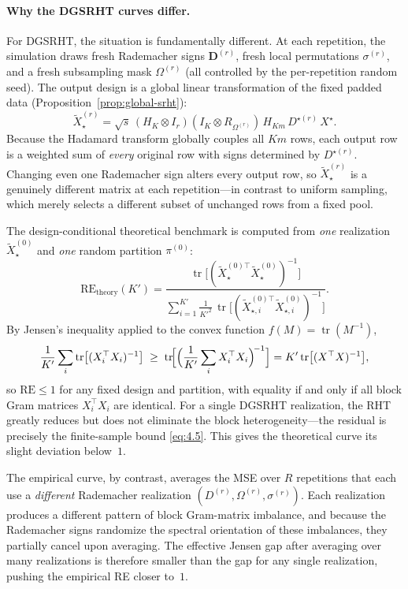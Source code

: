 \documentclass[11pt]{article}
\numberwithin{equation}{section}
\theoremstyle{plain}
\theoremstyle{definition}
\theoremstyle{remark}
\begin{document}
\paragraph{Why the DGSRHT curves differ.}
For DGSRHT, the situation is fundamentally different.
At each repetition, the simulation draws fresh Rademacher signs $\mathbf{D}^{(r)}$, fresh local permutations $\sigma^{(r)}$, and a fresh subsampling mask $\Omega^{(r)}$ (all controlled by the per-repetition random seed).
The output design is a global linear transformation of the fixed padded data (Proposition~\ref{prop:global-srht}):
\[
  \tilde{X}_{\star}^{(r)}
  = \sqrt{s}\,(H_K\otimes I_r)(I_K\otimes R_{\Omega^{(r)}})\,H_{Km}\,D^{\star(r)}\,X^{\star}.
\]
Because the Hadamard transform globally couples all $Km$ rows, each output row is a weighted sum of \emph{every} original row with signs determined by $D^{\star(r)}$.
Changing even one Rademacher sign alters every output row, so $\tilde{X}_{\star}^{(r)}$ is a genuinely different matrix at each repetition---in contrast to uniform sampling, which merely selects a different subset of unchanged rows from a fixed pool.

The design-conditional theoretical benchmark is computed from \emph{one} realization $\tilde{X}_{\star}^{(0)}$ and \emph{one} random partition $\pi^{(0)}$:
\[
  \mathrm{RE}_{\mathrm{theory}}(K')
  = \frac{\operatorname{tr}\bigl[(\tilde{X}_{\star}^{(0)\top}\tilde{X}_{\star}^{(0)})^{-1}\bigr]}
         {\displaystyle\sum_{i=1}^{K'}\frac{1}{K'^{2}}\,
           \operatorname{tr}\bigl[(\tilde{X}_{\star,i}^{(0)\top}\tilde{X}_{\star,i}^{(0)})^{-1}\bigr]}.
\]
By Jensen's inequality applied to the convex function $f(M)=\operatorname{tr}(M^{-1})$,
\[
  \frac{1}{K'}\sum_{i}\operatorname{tr}\bigl[(X_i^{\top}X_i)^{-1}\bigr]
  \;\ge\;
  \operatorname{tr}\!\Bigl[\Bigl(\frac{1}{K'}\sum_{i}X_i^{\top}X_i\Bigr)^{\!-1}\Bigr]
  = K'\operatorname{tr}\bigl[(X^{\top}X)^{-1}\bigr],
\]
so $\mathrm{RE}\le 1$ for any fixed design and partition, with equality if and only if all block Gram matrices $X_i^{\top}X_i$ are identical.
For a single DGSRHT realization, the RHT greatly reduces but does not eliminate the block heterogeneity---the residual is precisely the finite-sample bound \eqref{eq:4.5}.
This gives the theoretical curve its slight deviation below~$1$.

The empirical curve, by contrast, averages the MSE over $R$ repetitions that each use a \emph{different} Rademacher realization $(D^{(r)},\Omega^{(r)},\sigma^{(r)})$.
Each realization produces a different pattern of block Gram-matrix imbalance, and because the Rademacher signs randomize the spectral orientation of these imbalances, they partially cancel upon averaging.
The effective Jensen gap after averaging over many realizations is therefore smaller than the gap for any single realization, pushing the empirical RE closer to~$1$.
\end{document}
